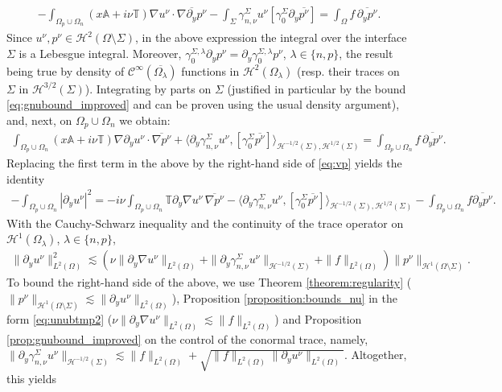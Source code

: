 \documentclass[report]{elsarticle}
\numberwithin{theorem}{section}
\begin{document}
\begin{align*}
	-\int_{\Omega_p\cup\Omega_n}(x\mathbb{A}+i\nu\mathbb{T})\nabla u^{\nu}\cdot\overline{\nabla \partial_y p^{\nu}}-\int_{\Sigma}\gamma_{n, \nu}^{\Sigma}u^{\nu}[\gamma_{0}^{\Sigma}\partial_y \overline{p^{\nu}}]=\int_{\Omega}f\, \overline{\partial_y p^{\nu}}.
\end{align*}
Since $u^{\nu}, p^{\nu}\in \mathcal{H}^2(\Omega\setminus\Sigma)$, in the above expression the integral over the interface $\Sigma$ is a Lebesgue integral. Moreover, $\gamma_0^{\Sigma,\lambda}\partial_y p^{\nu}=\partial_y\gamma_0^{\Sigma,\lambda}p^{\nu}$, $\lambda\in \{n,p\}$, the result being true by density of $\mathcal{C}^{\infty}(\overline{\Omega_{\lambda}})$ functions in $\mathcal{H}^2(\Omega_{\lambda})$ (resp. their traces on $\Sigma$ in $\mathcal{H}^{3/2}(\Sigma)$). 
Integrating by parts on $\Sigma$ (justified in particular by the bound \eqref{eq:gnubound_improved} and can be proven using the usual density argument),  and, next, on $\Omega_p\cup\Omega_n$ we obtain:
\begin{align}
	\label{eq:u_test_p}
	\int_{\Omega_p\cup\Omega_n}(x\mathbb{A}+i\nu\mathbb{T})\nabla \partial_y u^{\nu}\cdot\overline{\nabla p^{\nu}}+\langle \partial_y\gamma_{n, \nu}^{\Sigma}u^{\nu}, [\gamma_{0}^{\Sigma} \overline{p^{\nu}}]\rangle_{\mathcal{H}^{-1/2}(\Sigma), \mathcal{H}^{1/2}(\Sigma)}=\int_{\Omega_p\cup\Omega_n}f\, \overline{\partial_y p^{\nu}}.
\end{align}
Replacing the first term in the above by the right-hand side of \eqref{eq:vp} yields the identity
\begin{align*}
	-\int_{\Omega_p\cup\Omega_n}|\partial_y u^{\nu}|^2=-i\nu \int_{\Omega_p\cup\Omega_n}\mathbb{T}\partial_y \nabla u^{\nu}\, \overline{\nabla p^{\nu}}-\langle \partial_y\gamma_{n, \nu}^{\Sigma}u^{\nu}, [\gamma_{0}^{\Sigma} \overline{p^{\nu}}]\rangle_{\mathcal{H}^{-1/2}(\Sigma), \mathcal{H}^{1/2}(\Sigma)}-\int_{\Omega_p\cup\Omega_n}f\overline{\partial_y p^{\nu}}.
\end{align*}
With the Cauchy-Schwarz inequality and the continuity of the trace operator on $\mathcal{H}^1(\Omega_{\lambda})$, $\lambda\in \{n,p\}$,  
\begin{align*}
	\|\partial_y u^{\nu}\|^2_{L^2(\Omega)}\lesssim \left(\nu\|\partial_y \nabla u^{\nu}\|_{L^2(\Omega)}+\|\partial_y \gamma_{n,\nu}^{\Sigma}u^{\nu}\|_{\mathcal{H}^{-1/2}(\Sigma)}+\|f\|_{L^2(\Omega)}\right)\|p^{\nu}\|_{\mathcal{H}^1(\Omega\setminus\Sigma)}.
\end{align*}
To bound the right-hand side of the above, we use Theorem \ref{theorem:regularity} ($\|p^{\nu}\|_{\mathcal{H}^1(\Omega\setminus\Sigma)}\lesssim\|\partial_y u^{\nu}\|_{L^2(\Omega)}$), Proposition \ref{proposition:bounds_nu} in the form \eqref{eq:unubtmp2} ($\nu\|\partial_y \nabla u^{\nu}\|_{L^2(\Omega)}\lesssim \|f\|_{L^2(\Omega)}$) and Proposition \ref{prop:gnubound_improved} on the control of the conormal trace, namely, $\|\partial_y \gamma_{n,\nu}^{\Sigma}u^{\nu}\|_{\mathcal{H}^{-1/2}(\Sigma)}\lesssim \|f\|_{L^2(\Omega)}+\sqrt{\|f\|_{L^2(\Omega)}\|\partial_y u^{\nu}\|_{L^2(\Omega)}}$. Altogether, this yields
\end{document}

